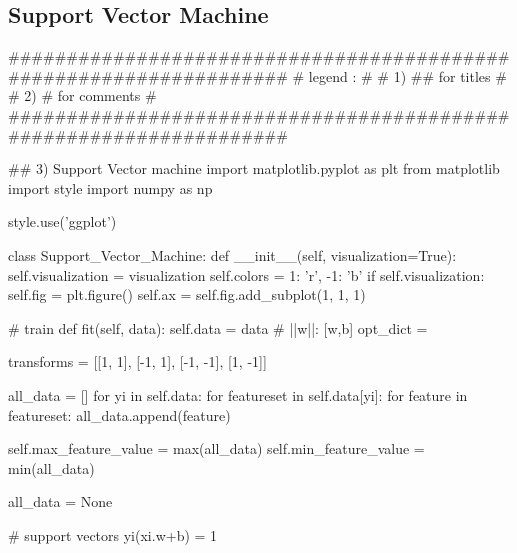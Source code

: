 \documentclass[11pt]{article}
\begin{document}
\subsection{ Support Vector Machine}
\begin{python}
###################################################################
# legend :                                                        #
#         1) ## for titles                                        #
#         2) #  for comments                                      #
###################################################################

## 3) Support Vector machine
import matplotlib.pyplot as plt
from matplotlib import style
import numpy as np

style.use('ggplot')


class Support_Vector_Machine:
    def __init__(self, visualization=True):
        self.visualization = visualization
        self.colors = {1: 'r', -1: 'b'}
        if self.visualization:
            self.fig = plt.figure()
            self.ax = self.fig.add_subplot(1, 1, 1)

    # train
    def fit(self, data):
        self.data = data
        # { ||w||: [w,b] }
        opt_dict = {}

        transforms = [[1, 1],
                      [-1, 1],
                      [-1, -1],
                      [1, -1]]

        all_data = []
        for yi in self.data:
            for featureset in self.data[yi]:
                for feature in featureset:
                    all_data.append(feature)

        self.max_feature_value = max(all_data)
        self.min_feature_value = min(all_data)

        all_data = None

        # support vectors yi(xi.w+b) = 1


\end{python}
\end{document}

